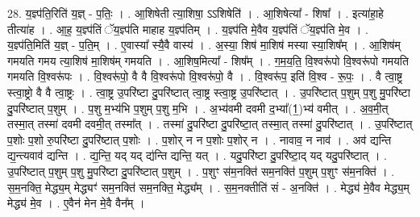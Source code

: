\documentclass[17pt]{extarticle}
\begin{document}
28. य॒ज्ञ्प॑ति॒रिति॑ य॒ज्ञ् - प॒तिः॒ । . आ॒शिषेती त्या॒शिषा॒ ऽऽशिषेति॑ । . आ॒शिषेत्या᳚ - शिषा᳚ । . इत्या॑हा॒हे तीत्या॑ह । . आ॒ह॒ य॒ज्ञ्प॑तिं ॅय॒ज्ञ्प॑ति माहाह य॒ज्ञ्प॑तिम् । . य॒ज्ञ्प॑ति मे॒वैव य॒ज्ञ्प॑तिं ॅय॒ज्ञ्प॑ति मे॒व । . य॒ज्ञ्प॑ति॒मिति॑ य॒ज्ञ् - प॒ति॒म् । . ए॒वास्या᳚ स्यै॒वै वास्य॑ । . अ॒स्या॒ शिष॑ मा॒शिष॑ मस्या स्या॒शिष᳚म् । . आ॒शिष॑म् गमयति गमय त्या॒शिष॑ मा॒शिष॑म् गमयति । . आ॒शिष॒मित्या᳚ - शिष᳚म् । . ग॒म॒य॒ति॒ वि॒श्वरू॑पो वि॒श्वरू॑पो गमयति गमयति वि॒श्वरू॑पः । . वि॒श्वरू॑पो॒ वै वै वि॒श्वरू॑पो वि॒श्वरू॑पो॒ वै । . वि॒श्वरू॑प॒ इति॑ वि॒श्व - रू॒पः॒ । . वै त्वा॒ष्ट्र स्त्वा॒ष्ट्रो वै वै त्वा॒ष्ट्रः । . त्वा॒ष्ट्र उ॒परि॑ष्टा दु॒परि॑ष्टात् त्वा॒ष्ट्र स्त्वा॒ष्ट्र उ॒परि॑ष्टात् । . उ॒परि॑ष्टात् प॒शुम् प॒शु मु॒परि॑ष्टा दु॒परि॑ष्टात् प॒शुम् । . प॒शु म॒भ्य॑भि प॒शुम् प॒शु म॒भि । . अ॒भ्य॑वमी दवमी द॒भ्या᳚(1॒)भ्य॑ वमीत् । . अ॒व॒मी॒त् तस्मा॒त् तस्मा॑ दवमी दवमी॒त् तस्मा᳚त् । . तस्मा॑ दु॒परि॑ष्टा दु॒परि॑ष्टा॒त् तस्मा॒त् तस्मा॑ दु॒परि॑ष्टात् । . उ॒परि॑ष्टात् प॒शोः प॒शो रु॒परि॑ष्टा दु॒परि॑ष्टात् प॒शोः । . प॒शोर् न न प॒शोः प॒शोर् न । . नावाव॒ न नाव॑ । . अव॑ द्यन्ति द्य॒न्त्यवाव॑ द्यन्ति । . द्य॒न्ति॒ यद् यद् द्य॑न्ति द्यन्ति॒ यत् । . यदु॒परि॑ष्टा दु॒परि॑ष्टा॒द् यद् यदु॒परि॑ष्टात् । . उ॒परि॑ष्टात् प॒शुम् प॒शु मु॒परि॑ष्टा दु॒परि॑ष्टात् प॒शुम् । . प॒शुꣳ स॑म॒नक्ति॑ सम॒नक्ति॑ प॒शुम् प॒शुꣳ स॑म॒नक्ति॑ । . स॒म॒नक्ति॒ मेद्ध्य॒म् मेद्ध्यꣳ॑ सम॒नक्ति॑ सम॒नक्ति॒ मेद्ध्य᳚म् । . स॒म॒नक्तीति॑ सं - अ॒नक्ति॑ । . मेद्ध्य॑ मे॒वैव मेद्ध्य॒म् मेद्ध्य॑ मे॒व । . ए॒वैन॑ मेन मे॒वै वैन᳚म् । \newline
\end{document}
